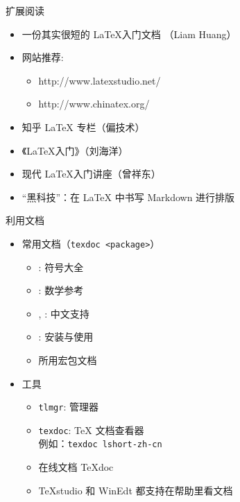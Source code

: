 \begin{frame}{扩展阅读}
  \begin{itemize}
    \item 一份其实很短的 \LaTeX 入门文档 （Liam Huang）
    \item 网站推荐:
          \begin{itemize}
            \item http://www.latexstudio.net/
            \item http://www.chinatex.org/
          \end{itemize}
    \item 知乎 \LaTeX{} 专栏（偏技术）
    \item 《\LaTeX{}入门》（刘海洋）
    \item 现代 LaTeX入门讲座（曾祥东）
    \item “黑科技”：在 \LaTeX{} 中书写 Markdown 进行排版
  \end{itemize}
\end{frame}

\begin{frame}[fragile]{利用文档}
  \begin{itemize}
    \item 常用文档（\verb|texdoc <package>|）
          \begin{itemize}
            \item {}: 符号大全
            \item {}: 数学参考
            \item {}, : 中文支持
            \item {}: \TL 安装与使用
            \item 所用宏包文档
          \end{itemize}
    \item 工具
          \begin{itemize}
            \item \verb|tlmgr|: \TL 管理器
            \item \verb|texdoc|: \TeX{} 文档查看器\\
                  例如：\verb|texdoc lshort-zh-cn|
            \item 在线文档 \TeX{}doc 
            \item \TeX{}studio 和 WinEdt 都支持在帮助里看文档
          \end{itemize}
  \end{itemize}
\end{frame}

